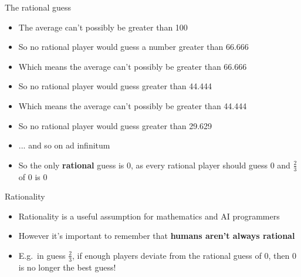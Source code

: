 	\begin{frame}{The rational guess}
		\begin{itemize}
			\pause\item The average can't possibly be greater than 100
			\pause\item So no rational player would guess a number greater than 66.666
			\pause\item Which means the average can't possibly be greater than 66.666
			\pause\item So no rational player would guess greater than 44.444
			\pause\item Which means the average can't possibly be greater than 44.444
			\pause\item So no rational player would guess greater than 29.629
			\pause\item ... and so on ad infinitum
			\pause\item So the only \textbf{rational} guess is 0, as every rational player should guess 0 and $\frac23$ of 0 is 0
		\end{itemize}
	\end{frame}

\begin{frame}{Rationality}
	\begin{itemize}
		\pause\item Rationality is a useful assumption for mathematics and AI programmers
		\pause\item However it's important to remember that \textbf{humans aren't always rational}
		\pause\item E.g.\ in guess $\frac23$, if enough players deviate from the rational guess of 0, then 0 is no longer the best guess!
	\end{itemize}
\end{frame}
